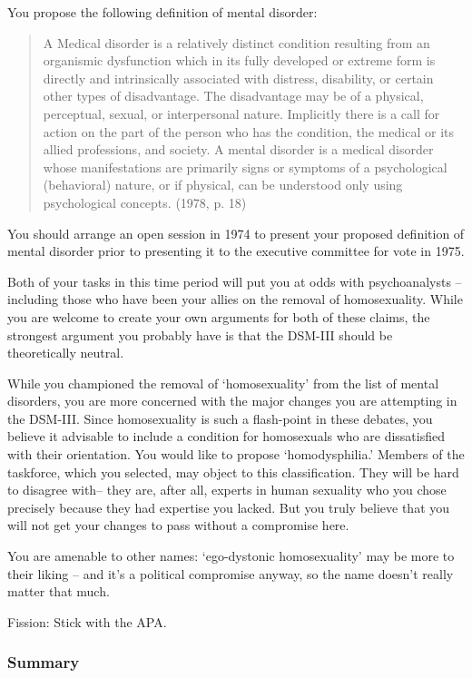 \begin{refsection}
You propose the following definition of mental disorder:

\begin{quote}

A Medical disorder is a relatively distinct condition resulting from an organismic dysfunction which in its fully developed or extreme form is directly and intrinsically associated with distress, disability, or certain other types of disadvantage. The disadvantage may be of a physical, perceptual, sexual, or interpersonal nature. Implicitly there is a call for action on the part of the person who has the condition, the medical or its allied professions, and society.
A mental disorder is a medical disorder whose manifestations are primarily signs or symptoms of a psychological (behavioral) nature, or if physical, can be understood only using psychological concepts. (1978, p. 18)
\end{quote}

You should arrange an open session in 1974 to present your proposed definition of mental disorder prior to presenting it to the executive committee for vote in 1975.

Both of your tasks in this time period will put you at odds with psychoanalysts – including those who have been your allies on the removal of homosexuality. While you are welcome to create your own arguments for both of these claims, the strongest argument you probably have is that the DSM-III should be theoretically neutral. 

While you championed the removal of `homosexuality' from the list of mental disorders, you are more concerned with the major changes you are attempting in the DSM-III. Since homosexuality is such a flash-point in these debates, you believe it advisable to include a condition for homosexuals who are dissatisfied with their orientation. You would like to propose `homodysphilia.' Members of the taskforce, which you selected, may object to this classification. They will be hard to disagree with-- they are, after all, experts in human sexuality who you chose precisely because they had expertise you lacked. But you truly believe that you will not get your changes to pass without a compromise here.

You are amenable to other names: `ego-dystonic homosexuality' may be more to their liking – and it's a political compromise anyway, so the name doesn't really matter that much.

Fission: Stick with the APA.

\subsubsection{Summary}
\label{summary}


\end{refsection}
